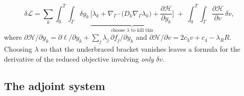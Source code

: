 \documentclass[11pt]{article}
\newcommand{\Grad}{\nabla_\Gamma}
\newcommand{\Div}{\nabla_\Gamma\cdot}
\newcommand{\Ham}{\mathcal{H}}
\newcommand{\Lag}{\mathcal{L}}
\begin{document}
\begin{equation}
\delta\Lag = \sum_k\int_0^T\!\!\int_\Gamma \delta y_k\,
\underbrace{\Big[\dot\lambda_k + \Div\big(D_k\Grad\lambda_k\big) + \frac{\partial \Ham}{\partial y_k}\Big]}_{\text{choose }\lambda\text{ to kill this}}
\;+\;\int_0^T\!\!\int_\Gamma \frac{\partial\Ham}{\partial v}\,\delta v,
\label{eq:collected}
\end{equation}
where $\partial\Ham/\partial y_k = \partial \ell/\partial y_k + \sum_j \lambda_j\,\partial f_j/\partial y_k$ and $\partial\Ham/\partial v = 2c_3 v + c_4 - \lambda_R R$. Choosing $\lambda$ so that the underbraced bracket vanishes leaves a formula for the derivative of the reduced objective involving \emph{only} $\delta v$.

\subsection{The adjoint system}
\label{sec:adjoint-system}
\end{document}
